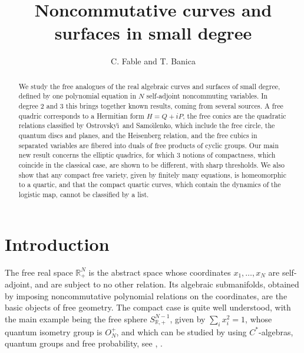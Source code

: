 \documentclass[11pt]{amsart}
\theoremstyle{definition}
\begin{document}
\title[Noncommutative curves and surfaces]{Noncommutative curves and surfaces in small degree}

\author{C. Fable and T. Banica}


\begin{abstract}
We study the free analogues of the real algebraic curves and surfaces of small degree, defined by one polynomial equation in $N$ self-adjoint noncommuting variables. In degree 2 and 3 this brings together known results, coming from several sources. A free quadric corresponds to a Hermitian form $H=Q+iP$, the free conics are the quadratic relations classified by Ostrovsky\u\i\ and Samo\u\i lenko, which include the free circle, the quantum discs and planes, and the Heisenberg relation, and the free cubics in separated variables are fibered into duals of free products of cyclic groups. Our main new result concerns the elliptic quadrics, for which 3 notions of compactness, which coincide in the classical case, are shown to be different, with sharp thresholds. We also show that any compact free variety, given by finitely many equations, is homeomorphic to a quartic, and that the compact quartic curves, which contain the dynamics of the logistic map, cannot be classified by a list.
\end{abstract}

\maketitle

\tableofcontents

\section*{Introduction}

The free real space $\mathbb R^N_+$ is the abstract space whose coordinates $x_1,\ldots,x_N$ are self-adjoint, and are subject to no other relation. Its algebraic submanifolds, obtained by imposing noncommutative polynomial relations on the coordinates, are the basic objects of free geometry. The compact case is quite well understood, with the main example being the free sphere $S^{N-1}_{\mathbb R,+}$, given by $\sum_ix_i^2=1$, whose quantum isometry group is $O_N^+$, and which can be studied by using $C^*$-algebras, quantum groups and free probability, see \cite{ban}, \cite{bgo}.
\end{document}
